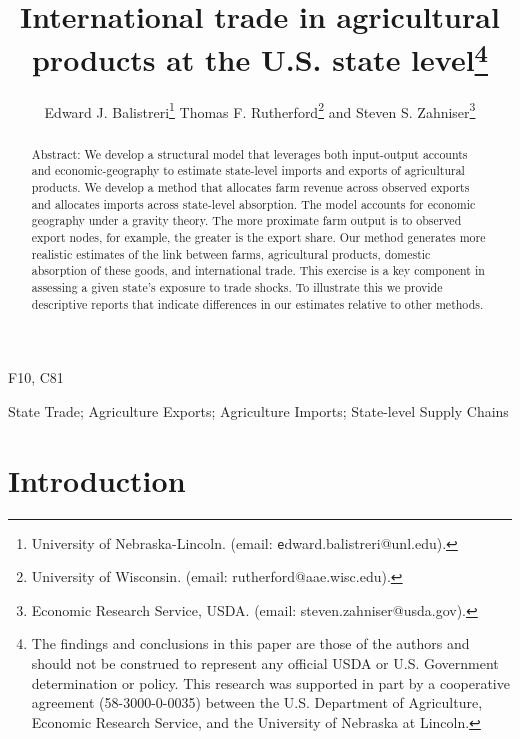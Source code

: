 \documentclass{ejb}
\begin{document}
\title{International trade in agricultural products at the
{U.S.} state level\footnote{
		The findings and conclusions in this paper are
	those of the authors and should not be construed to represent any
	official USDA or U.S. Government determination or policy. This
	research was supported in part by a cooperative agreement
	(58-3000-0-0035) between the U.S. Department of Agriculture,
	Economic Research Service, and the University of Nebraska at
	Lincoln.}
	}            
\author{\small
Edward J. Balistreri\footnote{
University of Nebraska-Lincoln. (email:
{\texttt edward.balistreri@unl.edu}).}
Thomas F. Rutherford\footnote{
University of Wisconsin.  (email:
rutherford@aae.wisc.edu).} and
Steven S. Zahniser\footnote{
Economic Research Service, USDA.  (email:
steven.zahniser@usda.gov).}
}


%
\maketitle

\begin{abstract}
Abstract:  We develop a structural model that leverages both
input-output accounts and economic-geography to estimate
state-level imports and exports of agricultural products.  We develop
a method that allocates farm revenue across observed exports and
allocates imports across state-level absorption. The model accounts
for economic geography under a gravity theory.  The more proximate
farm output is to observed export nodes, for example, the greater is
the export share.  Our method generates more realistic estimates of
the link between farms, agricultural products, domestic absorption of
these goods, and international trade.  This exercise is a key
component in assessing a given state's exposure to trade shocks.  To
illustrate this we provide descriptive reports that indicate
differences in our estimates relative to other methods.
\end{abstract}

\begin{jelcodes}
F10, C81
\end{jelcodes}

\begin{keywords}
State Trade; Agriculture Exports; Agriculture Imports; State-level
Supply Chains
\end{keywords}

\section{Introduction}
\end{document}
